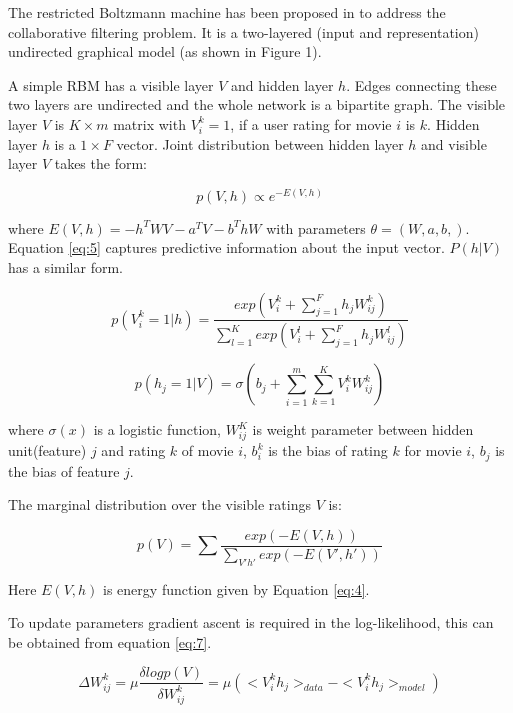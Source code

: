 \documentclass[conference]{IEEEtran}
\begin{document}
The restricted Boltzmann machine has been proposed in \cite{Salakhutdinov} to address the collaborative filtering problem. It is a two-layered (input and representation) undirected graphical model (as shown in Figure 1).

A simple RBM has a visible layer $V$ and hidden layer $h$. Edges connecting these two layers are undirected and the whole network is a bipartite graph. The visible layer $V$ is $K \times m$ matrix with $V_i^k=1$, if a user rating for movie $i$ is $k$. Hidden layer $h$ is a $1 \times F$ vector. Joint distribution between hidden layer $h$ and visible layer $V$ takes the form:

  \begin{equation} 
    p(V,h) \propto e^{-E(V,h)}
    \label{eq:4}
  \end{equation}

where $E(V,h) = -h^T W V - a^T V - b^T h W$ with parameters $\theta = (W,a,b,)$. Equation \ref{eq:5} captures predictive information about the input vector. $P(h|V)$ has a similar form.

  \begin{equation}
    p(V_i^k = 1|h) = \frac{exp(V_i^k + \sum_{j=1}^{F}h_j W_{ij}^k)}{\sum_{l=1}^{K}exp(V_i^l+\sum_{j=1}^{F}h_jW_{ij}^l)}
    \label{eq:5}
  \end{equation}

  \begin{equation}
    p(h_j=1|V) = \sigma(b_j+\sum_{i=1}^{m}\sum_{k=1}^{K}V_i^kW_{ij}^k)
    \label{eq:6}
  \end{equation}

where $\sigma(x)$ is a logistic function, $W_{ij}^K$ is weight parameter between hidden unit(feature) $j$ and rating $k$ of movie $i$, $b_i^k$ is the bias of rating $k$ for movie $i$, $b_j$ is the bias of feature $j$.

The marginal distribution over the visible ratings $V$ is:

  \begin{equation}
    p(V) = \sum\frac{exp(-E(V,h))}{\sum_{V'h'}exp(-E(V',h'))}
    \label{eq:7}
  \end{equation}

  Here $E(V,h)$ is energy function given by Equation \ref{eq:4}.

  To update parameters gradient ascent is required in the log-likelihood, this can be obtained from equation \ref{eq:7}.

  \begin{equation}
    \Delta W_{ij}^k = \mu \frac{\delta logp(V)}{\delta W_{ij}^k} = \mu (<V_i^kh_j>_{data} - <V_i^kh_j>_{model})
    \label{eq:8}
  \end{equation}
\end{document}
